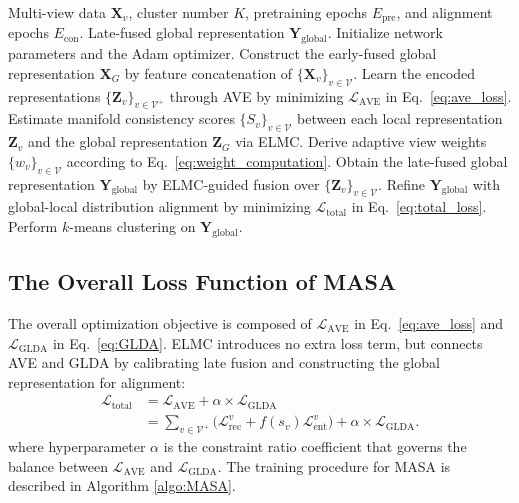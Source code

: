 \documentclass[10pt, journal, compsoc]{IEEEtran}
\begin{document}
\begin{algorithm}[ht]
\renewcommand{\algorithmicrequire}{\textbf{Input:}}
\renewcommand{\algorithmicensure}{\textbf{Output:}}
\caption{Training Workflow for MASA}
\label{algo:MASA}
\begin{algorithmic}[1]
    \REQUIRE Multi-view data $\mathbf{X}_{v}$, cluster number $K$, pretraining epochs $E_{\mathrm{pre}}$, and alignment epochs $E_{\mathrm{con}}$.
    \ENSURE Late-fused global representation $\boldsymbol{Y}_{\text{global}}$.
    \STATE Initialize network parameters and the Adam optimizer.
    \STATE Construct the early-fused global representation $\mathbf{X}_{G}$ by feature concatenation of $\{\mathbf{X}_{v}\}_{v\in\mathcal{V}}$.
        \STATE Learn the encoded representations $\{\mathbf{Z}_{v}\}_{v\in\mathcal{V}^{+}}$ through AVE by minimizing $\mathcal{L}_{\mathrm{AVE}}$ in Eq.~\eqref{eq:ave_loss}.
            \STATE Estimate manifold consistency scores $\{S_v\}_{v\in\mathcal{V}}$ between each local representation $\mathbf{Z}_{v}$ and the global representation $\mathbf{Z}_{G}$ via ELMC.
            \STATE Derive adaptive view weights $\{w_v\}_{v\in\mathcal{V}}$ according to Eq.~\eqref{eq:weight_computation}.
            \STATE Obtain the late-fused global representation $\boldsymbol{Y}_{\text{global}}$ by ELMC-guided fusion over $\{\mathbf{Z}_{v}\}_{v\in\mathcal{V}}$.
            \STATE Refine $\boldsymbol{Y}_{\text{global}}$ with global-local distribution alignment by minimizing $\mathcal{L}_{\mathrm{total}}$ in Eq.~\eqref{eq:total_loss}.
        \ENDIF
    \ENDFOR
    \STATE Perform $k$-means clustering on $\boldsymbol{Y}_{\text{global}}$.
\end{algorithmic}
\vspace{-0.2em}
\end{algorithm}

\subsection{The Overall Loss Function of MASA}
The overall optimization objective is composed of \(\mathcal{L}_{\text{AVE}}\) in Eq.~\eqref{eq:ave_loss} and \(\mathcal{L}_{\text{GLDA}}\) in Eq.~\eqref{eq:GLDA}. ELMC introduces no extra loss term, but connects AVE and GLDA by calibrating late fusion and constructing the global representation for alignment:
\begin{equation}
\begin{aligned}
\mathcal{L}_{\mathrm{total}}
&=
\mathcal{L}_{\mathrm{AVE}}
+
\alpha \times \mathcal{L}_{\mathrm{GLDA}}  \\
&=
\sum_{v\in\mathcal{V}^{+}}
\bigl(
\mathcal{L}_{\mathrm{rec}}^{v}
+
f(s_v)\mathcal{L}_{\mathrm{ent}}^{v}
\bigr)
+
\alpha \times \mathcal{L}_{\mathrm{GLDA}} .
\end{aligned}
\label{eq:total_loss}
\end{equation}
where hyperparameter \( \alpha \) is the constraint ratio coefficient that governs the balance between \( \mathcal{L}_{\text{AVE}} \) and \( \mathcal{L}_{\text{GLDA}} \). The training procedure for MASA is described in Algorithm \eqref{algo:MASA}.
\end{document}
